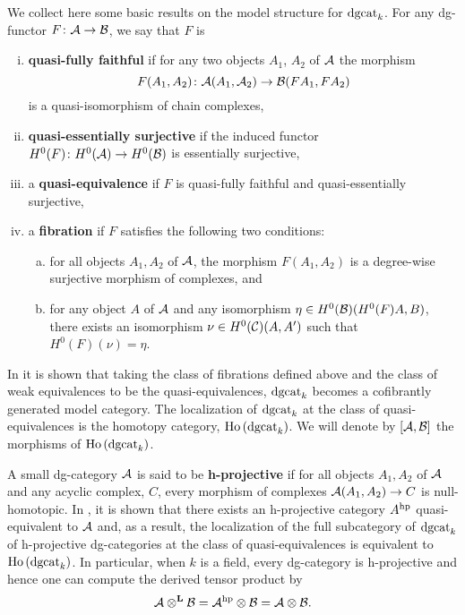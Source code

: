 We collect here some basic results on the model structure for \(\operatorname{dgcat}_k\).
For any dg-functor \(F \colon \mathcal{A} \to \mathcal{B}\), we say that \(F\) is
\begin{enumerate}[(i)]
\item
  \textbf{quasi-fully faithful} if for any two objects \(A_1\), \(A_2\) of \(\mathcal{A}\) the morphism
  \[F(A_1, A_2) \colon \mathcal{A}(A_1, \mathcal{A}_2) \to \mathcal{B}(FA_1, FA_2)\]
  is a quasi-isomorphism of chain complexes,
\item
  \textbf{quasi-essentially surjective} if the induced functor \(H^0(F) \colon H^0(\mathcal{A}) \to H^0(\mathcal{B})\) is essentially surjective,
\item
  a \textbf{quasi-equivalence} if \(F\) is quasi-fully faithful and quasi-essentially surjective,
\item
  a \textbf{fibration} if \(F\) satisfies the following two conditions:
  \begin{enumerate}[(a)]
  \item
    for all objects \(A_1, A_2\) of \(\mathcal{A}\), the morphism \(F(A_1,A_2)\) is a degree-wise surjective morphism of complexes, and
  \item
    for any object \(A\) of \(\mathcal{A}\) and any isomorphism \(\eta \in H^0(\mathcal{B})(H^0(F)A, B)\), there exists an isomorphism \(\nu \in H^0(\mathcal{C})(A,A^\prime)\) such that \(H^0(F)(\nu) = \eta\).
  \end{enumerate}
\end{enumerate}
In \parencite{Tabuada05} it is shown that taking the class of fibrations defined above and the class of weak equivalences to be the quasi-equivalences, \(\operatorname{dgcat}_k\) becomes a cofibrantly generated model category.
The localization of \(\operatorname{dgcat}_k\) at the class of quasi-equivalences is the homotopy category, \(\operatorname{Ho}\left(\operatorname{dgcat}_k\right)\).
We will denote by \([\mathcal{A},\mathcal{B}]\) the morphisms of \(\operatorname{Ho}\left(\operatorname{dgcat}_k\right)\).

A small dg-category \(\mathcal{A}\) is said to be \textbf{h-projective} if for all objects \(A_1, A_2\) of \(\mathcal{A}\) and any acyclic complex, \(C\), every morphism of complexes \(\mathcal{A}(A_1, A_2) \to C\) is null-homotopic.
In \parencite{CS15}, it is shown that there exists an h-projective category \(A^{\operatorname{hp}}\) quasi-equivalent to \(\mathcal{A}\) and, as a result, the localization of the full subcategory of \(\operatorname{dgcat}_k\) of h-projective dg-categories at the class of quasi-equivalences is equivalent to \(\operatorname{Ho}\left(\operatorname{dgcat}_k\right)\).
In particular, when \(k\) is a field, every dg-category is h-projective and hence one can compute the derived tensor product by
\[\mathcal{A} \otimes^\mathbf{L} \mathcal{B} = \mathcal{A}^{\operatorname{hp}} \otimes \mathcal{B} = \mathcal{A} \otimes \mathcal{B}.\]

